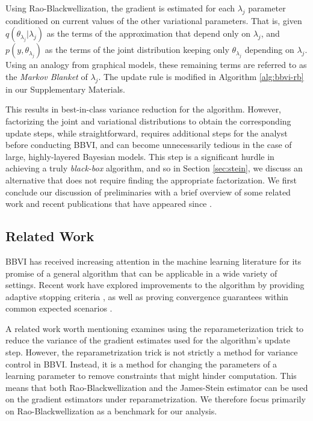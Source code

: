 \documentclass{article}
\begin{document}
Using Rao-Blackwellization, the gradient is estimated for each $\lambda_j$ parameter conditioned on current values of the other variational parameters. That is, given $q(\theta_{\lambda_j} | \lambda_j)$ as the terms of the approximation that depend only on $\lambda_j$, and $p(y, \theta_{\lambda_j})$ as the terms of the joint distribution keeping only $\theta_{\lambda_j}$ depending on $\lambda_j$. Using an analogy from graphical models, these remaining terms are referred to as the \textit{Markov Blanket} \cite{Pearl-1988} of $\lambda_j$. The update rule is modified in Algorithm \ref{alg:bbvi-rb} in our Supplementary Materials.

This results in best-in-class variance reduction for the algorithm. However, factorizing the joint and variational distributions to obtain the corresponding update steps, while straightforward, requires additional steps for the analyst before conducting BBVI, and can become unnecessarily tedious in the case of large, highly-layered Bayesian models. This step is a significant hurdle in achieving a truly \textit{black-box} algorithm, and so in Section \ref{sec:stein}, we discuss an alternative that does not require finding the appropriate factorization. We first conclude our discussion of preliminaries with a brief overview of some related work and recent publications that have appeared since \cite{Ranganath-2014}.

\subsection{Related Work}

BBVI has received increasing attention in the machine learning literature for its promise of a general algorithm that can be applicable in a wide variety of settings. Recent work have explored improvements to the algorithm by providing adaptive stopping criteria \cite{Welandawe-2022}, as well as proving convergence guarantees within common expected scenarios \cite{Domke-2020}.

A related work worth mentioning \cite{Xu-2019} examines using the reparameterization trick \cite{Kingma-2013, Rezende-2014} to reduce the variance of the gradient estimates used for the algorithm's update step. However, the reparametrization trick is not strictly a method for variance control in BBVI. Instead, it is a method for changing the parameters of a learning parameter to remove constraints that might hinder computation. This means that both Rao-Blackwellization and the James-Stein estimator can be used on the gradient estimators under reparametrization. We therefore focus primarily on Rao-Blackwellization as a benchmark for our analysis.
\end{document}
